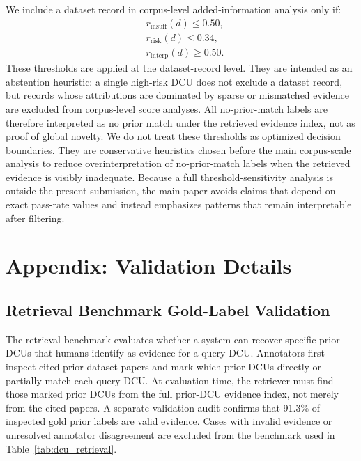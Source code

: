 \documentclass[11pt]{article}
\begin{document}
We include a dataset record in corpus-level added-information analysis only if:
\begin{equation}
\begin{split}
    &r_{\mathrm{insuff}}(d) \leq 0.50, \\
    &r_{\mathrm{risk}}(d) \leq 0.34, \\
    &r_{\mathrm{interp}}(d) \geq 0.50.
\end{split}
\end{equation}
These thresholds are applied at the dataset-record level.
They are intended as an abstention heuristic: a single high-risk DCU does not exclude a dataset record, but records whose attributions are dominated by sparse or mismatched evidence are excluded from corpus-level score analyses.
All no-prior-match labels are therefore interpreted as no prior match under the retrieved evidence index, not as proof of global novelty.
We do not treat these thresholds as optimized decision boundaries.
They are conservative heuristics chosen before the main corpus-scale analysis to reduce overinterpretation of no-prior-match labels when the retrieved evidence is visibly inadequate.
Because a full threshold-sensitivity analysis is outside the present submission, the main paper avoids claims that depend on exact pass-rate values and instead emphasizes patterns that remain interpretable after filtering.
\section{Appendix: Validation Details}
\label{app:validation_details}
\subsection{Retrieval Benchmark Gold-Label Validation}
\label{app:retrieval_validation_details}
The retrieval benchmark evaluates whether a system can recover specific prior DCUs that humans identify as evidence for a query DCU.
Annotators first inspect cited prior dataset papers and mark which prior DCUs directly or partially match each query DCU.
At evaluation time, the retriever must find those marked prior DCUs from the full prior-DCU evidence index, not merely from the cited papers.
A separate validation audit confirms that 91.3\% of inspected gold prior labels are valid evidence.
Cases with invalid evidence or unresolved annotator disagreement are excluded from the benchmark used in Table~\ref{tab:dcu_retrieval}.
\end{document}
